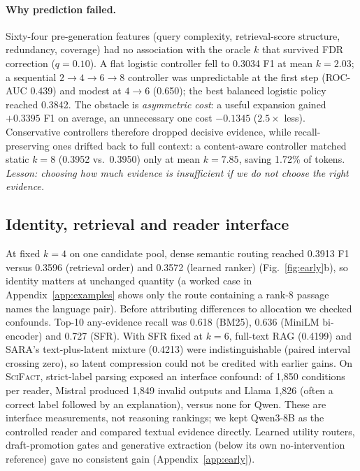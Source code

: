 \documentclass[10pt,twocolumn,letterpaper]{article}
\newcommand{\scifact}{\textsc{SciFact}\xspace}
\begin{document}
\paragraph{Why prediction failed.} Sixty-four pre-generation features (query complexity, retrieval-score structure, redundancy, coverage) had no association with the oracle $k$ that survived FDR correction ($q{=}0.10$). A flat logistic controller fell to 0.3034 F1 at mean $k{=}2.03$; a sequential $2{\to}4{\to}6{\to}8$ controller was unpredictable at the first step (ROC-AUC 0.439) and modest at $4{\to}6$ (0.650); the best balanced logistic policy reached 0.3842. The obstacle is \emph{asymmetric cost}: a useful expansion gained $+0.3395$ F1 on average, an unnecessary one cost $-0.1345$ ($2.5\times$ less). Conservative controllers therefore dropped decisive evidence, while recall-preserving ones drifted back to full context: a content-aware controller matched static $k{=}8$ (0.3952 vs.\ 0.3950) only at mean $k{=}7.85$, saving 1.72\% of tokens. \emph{Lesson: choosing how much evidence is insufficient if we do not choose the right evidence.}

\subsection{Identity, retrieval and reader interface}
At fixed $k{=}4$ on one candidate pool, dense semantic routing reached 0.3913 F1 versus 0.3596 (retrieval order) and 0.3572 (learned ranker) (Fig.~\ref{fig:early}b), so identity matters at unchanged quantity (a worked case in Appendix~\ref{app:examples} shows only the route containing a rank-8 passage names the language pair). Before attributing differences to allocation we checked confounds. Top-10 any-evidence recall was 0.618 (BM25), 0.636 (MiniLM bi-encoder) and 0.727 (SFR). With SFR fixed at $k{=}6$, full-text RAG (0.4199) and SARA's text-plus-latent mixture (0.4213) were indistinguishable (paired interval crossing zero), so latent compression could not be credited with earlier gains. On \scifact, strict-label parsing exposed an interface confound: of 1,850 conditions per reader, Mistral produced 1,849 invalid outputs and Llama 1,826 (often a correct label followed by an explanation), versus none for Qwen. These are interface measurements, not reasoning rankings; we kept Qwen3-8B as the controlled reader and compared textual evidence directly. Learned utility routers, draft-promotion gates and generative extraction (below its own no-intervention reference) gave no consistent gain (Appendix~\ref{app:early}).
\end{document}
